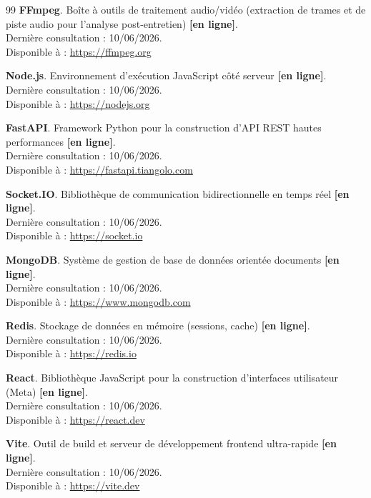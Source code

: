 \begin{thebibliography}{99}
\textbf{FFmpeg}. Boîte à outils de traitement audio/vidéo (extraction de trames et de piste audio pour l'analyse post-entretien) \textbf{[en ligne]}.\\
Dernière consultation : 10/06/2026.\\
Disponible à : \url{https://ffmpeg.org}

\textbf{Node.js}. Environnement d'exécution JavaScript côté serveur \textbf{[en ligne]}.\\
Dernière consultation : 10/06/2026.\\
Disponible à : \url{https://nodejs.org}

\textbf{FastAPI}. Framework Python pour la construction d'API REST hautes performances \textbf{[en ligne]}.\\
Dernière consultation : 10/06/2026.\\
Disponible à : \url{https://fastapi.tiangolo.com}

\textbf{Socket.IO}. Bibliothèque de communication bidirectionnelle en temps réel \textbf{[en ligne]}.\\
Dernière consultation : 10/06/2026.\\
Disponible à : \url{https://socket.io}

\textbf{MongoDB}. Système de gestion de base de données orientée documents \textbf{[en ligne]}.\\
Dernière consultation : 10/06/2026.\\
Disponible à : \url{https://www.mongodb.com}

\textbf{Redis}. Stockage de données en mémoire (sessions, cache) \textbf{[en ligne]}.\\
Dernière consultation : 10/06/2026.\\
Disponible à : \url{https://redis.io}

\textbf{React}. Bibliothèque JavaScript pour la construction d'interfaces utilisateur (Meta) \textbf{[en ligne]}.\\
Dernière consultation : 10/06/2026.\\
Disponible à : \url{https://react.dev}

\textbf{Vite}. Outil de build et serveur de développement frontend ultra-rapide \textbf{[en ligne]}.\\
Dernière consultation : 10/06/2026.\\
Disponible à : \url{https://vite.dev}


\end{thebibliography}
